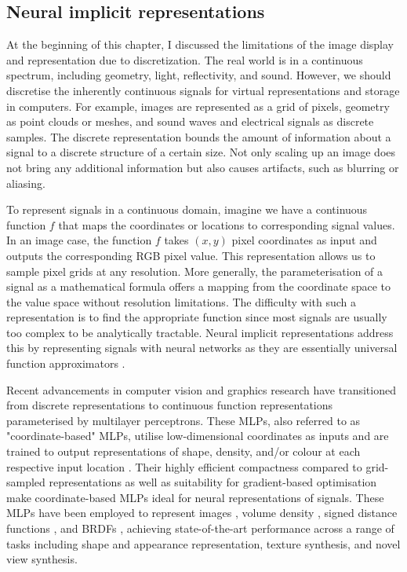 \subsection{Neural implicit representations}

At the beginning of this chapter, I discussed the limitations of the image display and representation due to discretization. The real world is in a continuous spectrum, including geometry, light, reflectivity, and sound. However, we should discretise the inherently continuous signals for virtual representations and storage in computers. For example, images are represented as a grid of pixels, geometry as point clouds or meshes, and sound waves and electrical signals as discrete samples. The discrete representation bounds the amount of information about a signal to a discrete structure of a certain size. Not only scaling up an image does not bring any additional information but also causes artifacts, such as blurring or aliasing. 

To represent signals in a continuous domain, imagine we have a continuous function $f$ that maps the coordinates or locations to corresponding signal values. In an image case, the function $f$ takes $(x, y)$ pixel coordinates as input and outputs the corresponding RGB pixel value. This representation allows us to sample pixel grids at any resolution. More generally, the parameterisation of a signal as a mathematical formula offers a mapping from the coordinate space to the value space without resolution limitations. The difficulty with such a representation is to find the appropriate function since most signals are usually too complex to be analytically tractable. Neural implicit representations address this by representing signals with neural networks as they are essentially universal function approximators \cite{cybenko1989approximation}.

Recent advancements in computer vision and graphics research have transitioned from discrete representations to continuous function representations parameterised by multilayer perceptrons. These MLPs, also referred to as "coordinate-based" MLPs, utilise low-dimensional coordinates as inputs and are trained to output representations of shape, density, and/or colour at each respective input location \cite{ffn}. Their highly efficient compactness compared to grid-sampled representations as well as suitability for gradient-based optimisation make coordinate-based MLPs ideal for neural representations of signals. These MLPs have been employed to represent images \cite{nguyen2015deep}, volume density \cite{mildenhall2021nerf}, signed distance functions \cite{park2019deepsdf}, and BRDFs \cite{sztrajman2021neural}, achieving state-of-the-art performance across a range of tasks including shape and appearance representation, texture synthesis, and novel view synthesis.

